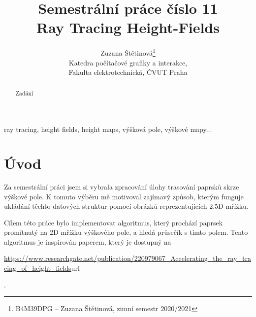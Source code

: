 \documentclass[report,11pt]{elsarticle}
\begin{document}
\begin{frontmatter}

\title{Semestrální práce číslo 11 \\ Ray Tracing Height-Fields}

\author{Zuzana Štětinová\footnote{B4M39DPG -- Zuzana Štětinová, zimní semestr 2020/2021}\\
Katedra počítačové grafiky a interakce,\\ Fakulta elektrotechnická, ČVUT Praha
}

\date{}


\begin{abstract}
 Zadání
\end{abstract}

\begin{keyword}
ray tracing, height fields, height maps, výšková pole, výškové mapy...
\end{keyword}

\end{frontmatter}



\section{\label{SEC:Intro}Úvod}

Za semestrální práci jsem si vybrala zpracování úlohy trasování paprsků skrze výškové pole. K tomuto výběru mě motivoval zajímavý způsob, kterým funguje ukládání těchto datových struktur pomocí obrázků reprezentujících 2.5D mřížku.


Cílem této práce bylo implementovat algoritmus, který prochází paprsek promítnutý na 2D mřížku výškového pole, a hledá průsečík s tímto polem. Tento algoritmus je inspirován paperem, který je dostupný na
\begin{small} \url{https://www.researchgate.net/publication/220979067_Accelerating_the_ray_tracing_of_height_fields}{url} \end{small}.
\end{document}
